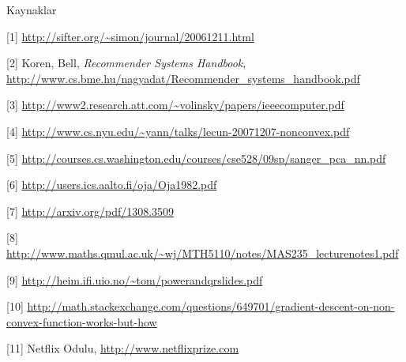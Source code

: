 \documentclass[12pt,fleqn]{article}\usepackage{../common}
\begin{document}
Kaynaklar

[1] \url{http://sifter.org/~simon/journal/20061211.html}

[2] Koren, Bell, {\em Recommender Systems Handbook},
\url{http://www.cs.bme.hu/nagyadat/Recommender_systems_handbook.pdf}

[3] \url{http://www2.research.att.com/~volinsky/papers/ieeecomputer.pdf}

[4] \url{http://www.cs.nyu.edu/~yann/talks/lecun-20071207-nonconvex.pdf}

[5] \url{http://courses.cs.washington.edu/courses/cse528/09sp/sanger_pca_nn.pdf}

[6] \url{http://users.ics.aalto.fi/oja/Oja1982.pdf}

[7] \url{http://arxiv.org/pdf/1308.3509}

[8] \url{http://www.maths.qmul.ac.uk/~wj/MTH5110/notes/MAS235_lecturenotes1.pdf}

[9] \url{http://heim.ifi.uio.no/~tom/powerandqrslides.pdf}

[10] \url{http://math.stackexchange.com/questions/649701/gradient-descent-on-non-convex-function-works-but-how}

[11] Netflix Odulu, \url{http://www.netflixprize.com}
\end{document}
